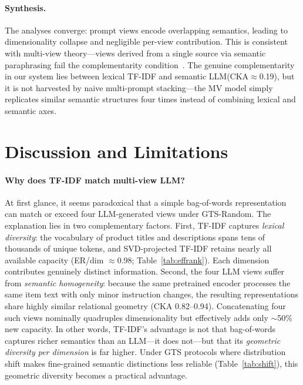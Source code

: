 \documentclass[sigconf,natbib=true,anonymous]{acmart}
\newcommand{\tfidf}{\textsc{TF-IDF}\xspace}
\newcommand{\llm}{\textsc{LLM}\xspace}
\begin{document}
\paragraph{Synthesis.}
The analyses converge: prompt views encode overlapping semantics, leading to dimensionality collapse and negligible per-view contribution.
This is consistent with multi-view theory---views derived from a single source via semantic paraphrasing fail the complementarity condition~\cite{xu2013multiview}.
The genuine complementarity in our system lies between lexical \tfidf and semantic \llm (CKA$\approx$0.19), but it is not harvested by naive multi-prompt stacking---the MV model simply replicates similar semantic structures four times instead of combining lexical and semantic axes.

\section{Discussion and Limitations}
\label{sec:discussion}

\paragraph{Why does TF-IDF match multi-view LLM?}
At first glance, it seems paradoxical that a simple bag-of-words representation can match or exceed four LLM-generated views under GTS-Random.
The explanation lies in two complementary factors.
First, \tfidf captures \emph{lexical diversity}: the vocabulary of product titles and descriptions spans tens of thousands of unique tokens, and SVD-projected TF-IDF retains nearly all available capacity (ER/dim $\approx$0.98; Table~\ref{tab:effrank}).
Each dimension contributes genuinely distinct information.
Second, the four LLM views suffer from \emph{semantic homogeneity}: because the same pretrained encoder processes the same item text with only minor instruction changes, the resulting representations share highly similar relational geometry (CKA 0.82--0.94).
Concatenating four such views nominally quadruples dimensionality but effectively adds only $\sim$50\% new capacity.
In other words, TF-IDF's advantage is not that bag-of-words captures richer semantics than an LLM---it does not---but that its \emph{geometric diversity per dimension} is far higher.
Under GTS protocols where distribution shift makes fine-grained semantic distinctions less reliable (Table~\ref{tab:shift}), this geometric diversity becomes a practical advantage.
\end{document}

